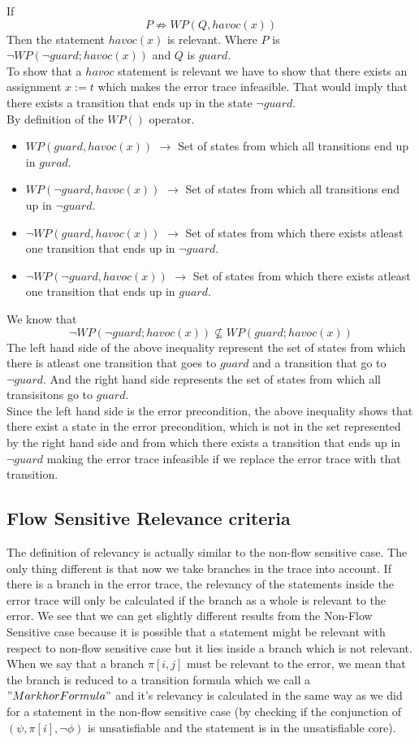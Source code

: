 \documentclass{article}
\newcommand{\limp}{\Rightarrow}
\begin{document}
If
$$P \not\limp WP(Q,havoc(x))$$
Then the statement $havoc(x)$ is relevant. Where $P$ is $\neg WP(\neg guard; havoc(x))$ and $Q$ is $guard$. \\
To show that a $havoc$ statement is relevant we have to show that there exists an assignment $x:=t$ which makes the error trace infeasible. That would imply that there exists a transition that ends up in the state $\neg guard$.\\
By definition of the $WP()$ operator.
\begin{itemize}
  \item $WP(guard, havoc(x))$ $\rightarrow$ Set of states from which all transitions end up in $gurad$.
  \item $WP(\neg guard, havoc(x))$ $\rightarrow$ Set of states from which all transitions end up in $\neg guard$.
  \item $\neg WP(guard, havoc(x))$ $\rightarrow$ Set of states from which there exists atleast one transition that ends up in $\neg guard$.
  \item $\neg WP(\neg guard, havoc(x))$ $\rightarrow$ Set of states from which there exists atleast one transition that ends up in $ guard$.
\end{itemize}
We know that 
$$\neg WP(\neg guard; havoc(x)) \not \subseteq WP(guard; havoc(x))$$
The left hand side of the above inequality represent the set of states from which there is atleast one transition that goes to $guard$ and a transition that go to $\neg guard$. And the right hand side represents the set of states from which all transisitons go to $guard$.\\
Since the left hand side is the error precondition, the above inequality shows that there exist a state in the error precondition, which is not in the set represented by the right hand side and from which there exists a transition that ends up in $\neg guard$ making the error trace infeasible if we replace the error trace with that transition.\\

\subsection{Flow Sensitive Relevance criteria }
The definition of relevancy is actually similar to the non-flow sensitive case. The only thing different is that now we take branches in the trace into account. If there is a branch in the error trace, the relevancy of the statements inside the error trace will only be calculated if the branch as a whole is relevant to the error. We see that we can get slightly different results from the Non-Flow Sensitive case because it is possible that a statement might be relevant with respect to non-flow sensitive case but it lies inside a branch which is not relevant. \\
When we say that a branch $\pi[i,j]$ must be relevant to the error, we mean that the branch is reduced to a transition formula which we call a $"Markhor Formula"$ and it's relevancy is calculated in the same way as we did for a statement in the non-flow sensitive case (by checking if the conjunction of $(\psi, \pi[i],\neg \phi)$ is unsatisfiable and the statement is in the unsatisfiable core).
\end{document}

